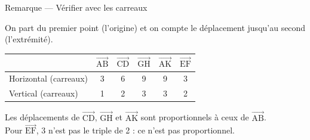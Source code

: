 \documentclass[border=4pt]{standalone}
\newcommand{\V}[1]{\overrightarrow{\mathrm{#1}}}
\begin{document}
\begin{minipage}{16cm}\large {\color{gris}\Large Remarque — Vérifier avec les carreaux}\par\vspace{4pt}On part du premier point (l'origine) et on compte le déplacement jusqu'au second (l'extrémité).\par {\normalsize\begin{tabular}{l|ccccc} & $\V{AB}$ & $\V{CD}$ & $\V{GH}$ & $\V{AK}$ & $\V{EF}$\\\hline Horizontal (carreaux) & 3 & 6 & 9 & 9 & 3\\ Vertical (carreaux) & 1 & 2 & 3 & 3 & 2\end{tabular}}\par Les déplacements de $\V{CD}$, $\V{GH}$ et $\V{AK}$ sont proportionnels à ceux de $\V{AB}$.\\ Pour $\V{EF}$, 3 n'est pas le triple de 2 : ce n'est pas proportionnel.\end{minipage}
\end{document}
